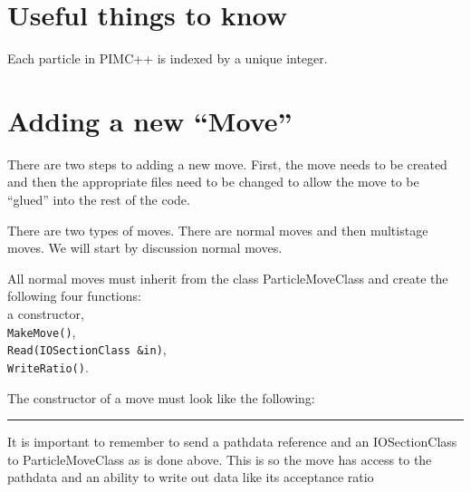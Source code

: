 \documentclass{book}
\begin{document}
\section{Useful things to know}
Each particle in PIMC++ is indexed by a unique integer. 
\section{Adding a new ``Move''}
There are two steps to adding a new move. First, the move needs to be
created and then the appropriate files need to be changed to allow the
move to be ``glued'' into the rest of the code.

There are two types of moves. There are normal moves and then
multistage moves. We will start by discussion normal moves.

All normal moves must inherit from the class ParticleMoveClass and 
create the following four functions: \\
a constructor,\\
\texttt{MakeMove()},\\
\texttt{Read(IOSectionClass \&in)},  \\
\texttt{WriteRatio()}.

The constructor of a move must look like the following:\\

\rule{0.6cm}{0cm}

It is important to remember to send a pathdata reference and an
  IOSectionClass to ParticleMoveClass as is done above. This is so the
  move has access to the pathdata and an ability to write out data
  like its acceptance ratio
\end{document}
